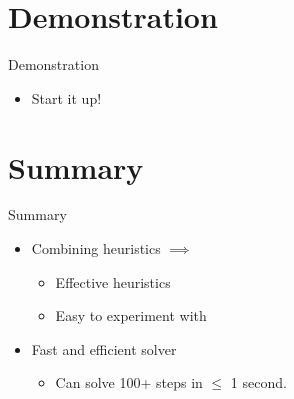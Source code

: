 \section{Demonstration}

\begin{frame}{Demonstration}
  \begin{center}
    \begin{itemize}
    \item Start it up!
    \end{itemize}
  \end{center}
\end{frame}

\section{Summary}
\begin{frame}{Summary}
    \begin{itemize}
    \item Combining heuristics $\implies$ 
      \begin{itemize}
      \item Effective heuristics
      \item Easy to experiment with
      \end{itemize}
    \end{itemize}


    \begin{itemize}
        
    \item Fast and efficient solver
      \begin{itemize}
      \item Can solve 100+ steps in $\leq$ 1 second.
      \end{itemize}
      

    \end{itemize}

\end{frame}